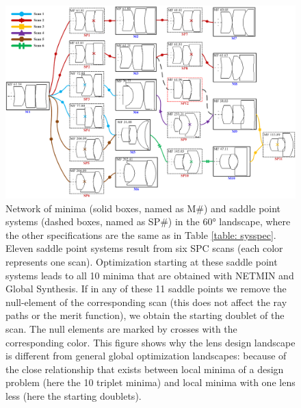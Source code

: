 \begin{figure}[h!]
    \centering
    \setlength{\belowcaptionskip}{-15pt}
    \includegraphics[scale=0.41]{chapter-3/figures/TripletNetwork.png}
    \caption{Network of minima (solid boxes, named as M\#) and saddle point systems (dashed boxes, named as SP\#) in the 60° landscape, where the other specifications are the same as in Table \ref{table: sysspec}. Eleven saddle point systems result from six SPC scans (each color represents one scan). Optimization starting at these saddle point systems leads to all 10 minima that are obtained with NETMIN and Global Synthesis. If in any of these 11 saddle points we remove the null-element of the corresponding scan (this does not affect the ray paths or the merit function), we obtain the starting doublet of the scan. The null elements are marked by crosses with the corresponding color. This figure shows why the lens design landscape is different from general global optimization landscapes: because of the close relationship that exists between local minima of a design problem (here the 10 triplet minima) and local minima with one lens less (here the starting doublets).}\label{fig:tripletnetwork}
\end{figure}
